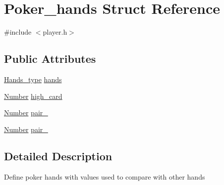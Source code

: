 \hypertarget{structPoker__hands}{\section{Poker\+\_\+hands Struct Reference}
\label{structPoker__hands}
}


{\ttfamily \#include $<$player.\+h$>$}

\subsection*{Public Attributes}
\begin{DoxyCompactItemize}
\item 
\hyperlink{player_8h_a59d630254d7ef6acd907142c9a263a00}{Hands\+\_\+type} \hyperlink{structPoker__hands_a7b36a51226eea12e0860c901a770820f}{hands}
\item 
\hyperlink{card_8h_a0764905e1a892d668acfcc35d5a79d36}{Number} \hyperlink{structPoker__hands_a5e69528aafb7fd7a71ad83d7a7f03456}{high\+\_\+card}
\item 
\hyperlink{card_8h_a0764905e1a892d668acfcc35d5a79d36}{Number} \hyperlink{structPoker__hands_ad0638d6685ba9b386f479f14c47c0790}{pair\+\_}
\item 
\hyperlink{card_8h_a0764905e1a892d668acfcc35d5a79d36}{Number} \hyperlink{structPoker__hands_aaa7790b1295984b266b3609a2f582bb8}{pair\+\_}
\end{DoxyCompactItemize}


\subsection{Detailed Description}
Define poker hands with values used to compare with other hands 

